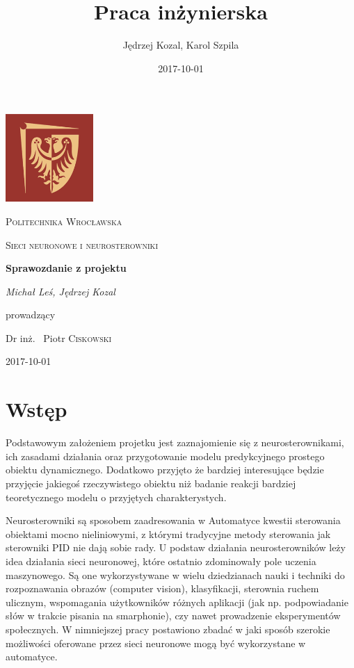 \documentclass{article}
\title{Praca inżynierska}
\date{2017-10-01}
\author{Jędrzej Kozal, Karol Szpila}
\begin{document}
\begin{titlepage}
	\centering
	\includegraphics[width=0.25\textwidth]{logo_pol_wroclaw.png}\par\vspace{1cm}
	{\scshape\LARGE Politechnika Wrocławska \par}
	\vspace{1cm}
	{\scshape\Large Sieci neuronowe i neurosterowniki \par}
	\vspace{1.5cm}
	{\huge\bfseries Sprawozdanie z projektu \par}
	\vspace{2cm}
	{\Large\itshape Michał Leś, Jędrzej Kozal\par}
	\vfill
	prowadzący\par
	Dr inż. ~Piotr \textsc{Ciskowski}

	\vfill

	{\large 2017-10-01\par}
\end{titlepage}

\section{Wstęp}
Podstawowym założeniem projetku jest zaznajomienie się z neurosterownikami, ich zasadami działania oraz przygotowanie modelu predykcyjnego prostego obiektu dynamicznego. Dodatkowo przyjęto że bardziej interesujące będzie przyjęcie jakiegoś rzeczywistego obiektu niż badanie reakcji bardziej teoretycznego modelu o przyjętych charakterystych.

Neurosterowniki są sposobem zaadresowania w Automatyce kwestii sterowania obiektami mocno nieliniowymi, z którymi tradycyjne metody sterowania jak sterowniki PID nie dają sobie rady. U podstaw działania neurosterowników leży idea działania sieci neuronowej, które ostatnio zdominowały pole uczenia maszynowego. Są one wykorzystywane w wielu dziedzianach nauki i techniki do rozpoznawania obrazów (computer vision), klasyfikacji, sterownia ruchem ulicznym, wspomagania użytkowników różnych aplikacji (jak np. podpowiadanie słów w trakcie pisania na smarphonie), czy nawet prowadzenie eksperymentów społecznych. W nimniejszej pracy postawiono zbadać w jaki sposób szerokie możliwości oferowane przez sieci neuronowe mogą być wykorzystane w automatyce.
\end{document}
